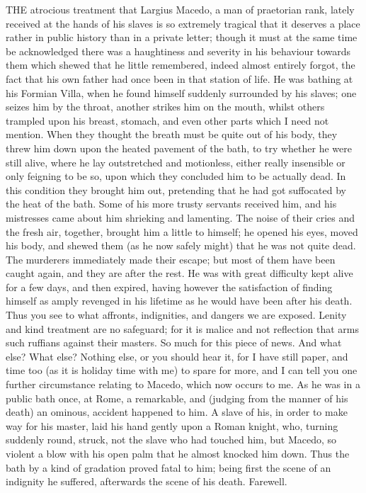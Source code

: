 THE atrocious treatment that Largius Macedo, a man of praetorian rank,
lately received at the hands of his slaves is so extremely tragical that
it deserves a place rather in public history than in a private letter;
though it must at the same time be acknowledged there was a haughtiness
and severity in his behaviour towards them which shewed that he little
remembered, indeed almost entirely forgot, the fact that his own father
had once been in that station of life. He was bathing at his Formian
Villa, when he found himself suddenly surrounded by his slaves; one seizes
him by the throat, another strikes him on the mouth, whilst others
trampled upon his breast, stomach, and even other parts which I need not
mention. When they thought the breath must be quite out of his body, they
threw him down upon the heated pavement of the bath, to try whether he
were still alive, where he lay outstretched and motionless, either really
insensible or only feigning to be so, upon which they concluded him to be
actually dead. In this condition they brought him out, pretending that he
had got suffocated by the heat of the bath. Some of his more trusty
servants received him, and his mistresses came about him shrieking and
lamenting. The noise of their cries and the fresh air, together, brought
him a little to himself; he opened his eyes, moved his body, and shewed
them (as he now safely might) that he was not quite dead. The murderers
immediately made their escape; but most of them have been caught again,
and they are after the rest. He was with great difficulty kept alive for a
few days, and then expired, having however the satisfaction of finding
himself as amply revenged in his lifetime as he would have been after his
death. Thus you see to what affronts, indignities, and dangers we are
exposed. Lenity and kind treatment are no safeguard; for it is malice and
not reflection that arms such ruffians against their masters. So much for
this piece of news. And what else? What else? Nothing else, or you should
hear it, for I have still paper, and time too (as it is holiday time with
me) to spare for more, and I can tell you one further circumstance
relating to Macedo, which now occurs to me. As he was in a public bath
once, at Rome, a remarkable, and (judging from the manner of his death) an
ominous, accident happened to him. A slave of his, in order to make way
for his master, laid his hand gently upon a Roman knight, who, turning
suddenly round, struck, not the slave who had touched him, but Macedo, so
violent a blow with his open palm that he almost knocked him down. Thus
the bath by a kind of gradation proved fatal to him; being first the scene
of an indignity he suffered, afterwards the scene of his death. Farewell.

